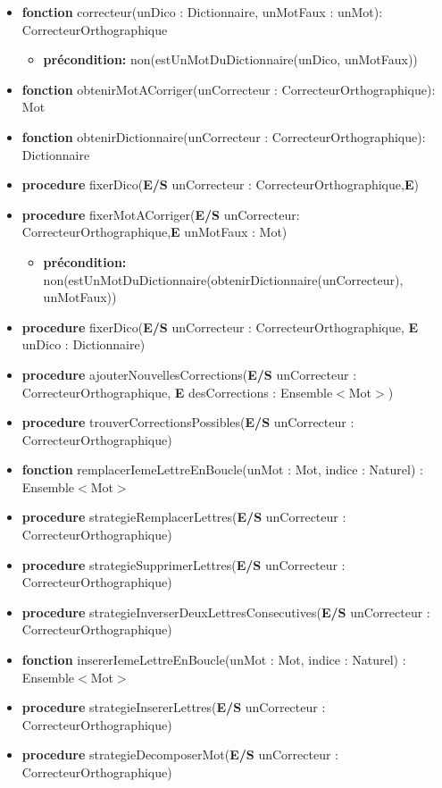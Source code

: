 \documentclass{article}
\begin{document}
	\begin{itemize}[label=$\ $, leftmargin=1cm]
		 
		 \item \textbf{fonction} correcteur(unDico : Dictionnaire, unMotFaux : unMot): CorrecteurOrthographique
		 \begin{itemize}[label=$| $]
            \item \textbf{précondition:} non(estUnMotDuDictionnaire(unDico, unMotFaux))
         \end{itemize}
		 \item \textbf{fonction} obtenirMotACorriger(unCorrecteur : CorrecteurOrthographique): Mot
		 \item \textbf{fonction} obtenirDictionnaire(unCorrecteur : CorrecteurOrthographique): Dictionnaire
		 \item \textbf{procedure} fixerDico(\textbf{E/S} unCorrecteur : CorrecteurOrthographique,\textbf{E})
		 \item \textbf{procedure} fixerMotACorriger(\textbf{E/S} unCorrecteur: CorrecteurOrthographique,\textbf{E} unMotFaux : Mot)
		 \begin{itemize}[label=$| $]
            \item \textbf{précondition:} non(estUnMotDuDictionnaire(obtenirDictionnaire(unCorrecteur), unMotFaux))
         \end{itemize}
		 \item \textbf{procedure} fixerDico(\textbf{E/S} unCorrecteur : CorrecteurOrthographique, \textbf{E} unDico : Dictionnaire)
		 \item \textbf{procedure} ajouterNouvellesCorrections(\textbf{E/S} unCorrecteur : CorrecteurOrthographique, \textbf{E} desCorrections : Ensemble$<$Mot$>$)
		 \item \textbf{procedure} trouverCorrectionsPossibles(\textbf{E/S} unCorrecteur : CorrecteurOrthographique)
		 \item \textbf{fonction} remplacerIemeLettreEnBoucle(unMot : Mot, indice : Naturel) : Ensemble$<$Mot$>$
		 \item \textbf{procedure} strategieRemplacerLettres(\textbf{E/S} unCorrecteur : CorrecteurOrthographique)
		 \item \textbf{procedure} strategieSupprimerLettres(\textbf{E/S} unCorrecteur : CorrecteurOrthographique)
		 \item \textbf{procedure} strategieInverserDeuxLettresConsecutives(\textbf{E/S} unCorrecteur : CorrecteurOrthographique)
		 \item \textbf{fonction} insererIemeLettreEnBoucle(unMot : Mot, indice : Naturel) : Ensemble$<$Mot$>$
		 \item \textbf{procedure} strategieInsererLettres(\textbf{E/S} unCorrecteur : CorrecteurOrthographique)
		 \item \textbf{procedure} strategieDecomposerMot(\textbf{E/S} unCorrecteur : CorrecteurOrthographique)
		 
		 
		 
         
         
        
	\end{itemize} 
    
\end{document}
